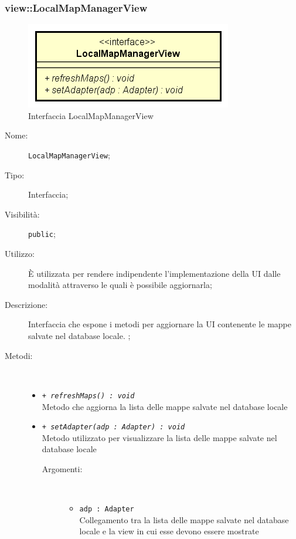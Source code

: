 \documentclass[../DefinizioneDiProdotto.tex]{subfiles}
\begin{document}
\subsubsection{view::LocalMapManagerView}

    \begin{figure}[H]
        \centering
        \includegraphics{img/LocalMapManagerView.png}
        \caption{Interfaccia LocalMapManagerView}\label{fig:view::LocalMapManagerView} 
    \end{figure}
    \begin{description}
\item[Nome:] \texttt{LocalMapManagerView};
\item[Tipo:] Interfaccia;
\item[Visibilità:] \texttt{public};
\item[Utilizzo:] È utilizzata per rendere indipendente l'implementazione della UI dalle modalità attraverso le quali è possibile aggiornarla;
\item[Descrizione:] Interfaccia che espone i metodi per aggiornare la UI contenente le mappe salvate nel database locale. ;
\item[Metodi:] \
\begin{itemize}
\item \texttt{+ \textit{refreshMaps() : void}}\\
Metodo che aggiorna la lista delle mappe salvate nel database locale
 \item \texttt{+ \textit{setAdapter(adp : Adapter) : void}}\\
Metodo utilizzato per visualizzare la lista delle mappe salvate nel database locale
 \begin{description}
\item[Argomenti:] \
\begin{itemize}
\item \texttt{adp : Adapter}\\
Collegamento tra la lista delle mappe salvate nel database locale e la view in cui esse devono essere mostrate\end{itemize}
\end{description}
\end{itemize}
\end{description}
\end{document}
